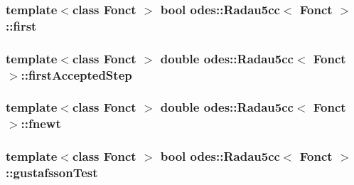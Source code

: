 \hypertarget{classodes_1_1Radau5cc_a788454a3dee88b6547430e881856fec7}{
\subsubsection[{first}]{\setlength{\rightskip}{0pt plus 5cm}template$<$class Fonct $>$ bool {\bf odes\-::\-Radau5cc}$<$ Fonct $>$\-::first\hspace{0.3cm}{\ttfamily [private]}}}\label{classodes_1_1Radau5cc_a788454a3dee88b6547430e881856fec7}
\hypertarget{classodes_1_1Radau5cc_a1a7b580bbae9fcd5c49fa116e877ac5c}{
\subsubsection[{first\-Accepted\-Step}]{\setlength{\rightskip}{0pt plus 5cm}template$<$class Fonct $>$ double {\bf odes\-::\-Radau5cc}$<$ Fonct $>$\-::first\-Accepted\-Step\hspace{0.3cm}{\ttfamily [private]}}}\label{classodes_1_1Radau5cc_a1a7b580bbae9fcd5c49fa116e877ac5c}
\hypertarget{classodes_1_1Radau5cc_af6debb655768cb0a251e2886544d87cb}{
\subsubsection[{fnewt}]{\setlength{\rightskip}{0pt plus 5cm}template$<$class Fonct $>$ double {\bf odes\-::\-Radau5cc}$<$ Fonct $>$\-::fnewt\hspace{0.3cm}{\ttfamily [private]}}}\label{classodes_1_1Radau5cc_af6debb655768cb0a251e2886544d87cb}
\hypertarget{classodes_1_1Radau5cc_ad867e67510b9f73391d1778c96bb8e06}{
\subsubsection[{gustafsson\-Test}]{\setlength{\rightskip}{0pt plus 5cm}template$<$class Fonct $>$ bool {\bf odes\-::\-Radau5cc}$<$ Fonct $>$\-::gustafsson\-Test\hspace{0.3cm}{\ttfamily [private]}}}\label{classodes_1_1Radau5cc_ad867e67510b9f73391d1778c96bb8e06}
